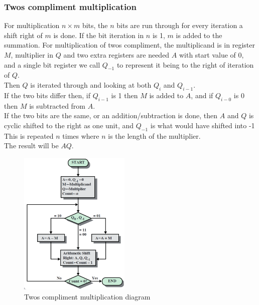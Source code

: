 \documentclass[12pt, a4paper]{article}
\begin{document}
			\subsubsection{Twos compliment multiplication}
				For multiplication $n\times m$ bits, the $n$ bits are run through for every iteration a shift right of $m$ is done. If the bit iteration in $n$ is 1, $m$ is added to the summation.
				For multiplication of twos compliment, the multiplicand is in register $M$, multiplier in $Q$ and two extra registers are needed $A$ with start value of 0, and a single bit register we call $Q_{-1}$ to represent it being to the right of iteration of $Q$.\\
				Then $Q$ is iterated through and looking at both $Q_i$ and $Q_{i-1}$.\\
				If the two bits differ then, if $Q_{i-1}$ is 1 then $M$ is added to $A$, and if $Q_{i-0}$ is 0 then $M$ is subtracted from $A$.\\
				If the two bits are the same, or an addition/subtraction is done, then $A$ and $Q$ is cyclic shifted to the right as one unit, and $Q_{-1}$ is what would have shifted into -1 \\
				This is repeated $n$ times where $n$ is the length of the multiplier.\\
				The result will be $AQ$.
				\begin{figure}[h!]
					\includegraphics[width=200px]{assets/twosComplimentMultiplication.png}
					\centering
					\caption{Twos compliment multiplication diagram}
				\end{figure}
\end{document}
